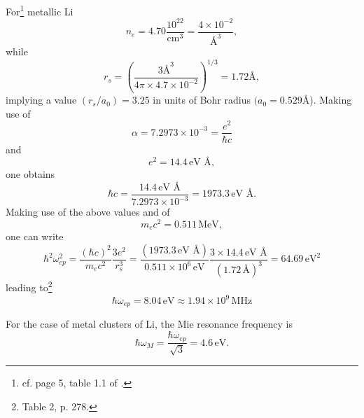 \begin{subappendices}
For\footnote{cf. page 5, table 1.1 of \cite{Ashcroft:87}.} metallic Li
\begin{equation}
n_e=4.70\frac{10^{22}}{\text{cm}^3}=\frac{4\times10^{-2}}{\text{\AA{}}^3},
\end{equation}
while
\begin{equation}
r_s=\left(\frac{3\text{\AA}^3}{4\pi\times4.7\times10^{-2}}\right)^{1/3}=1.72\text{\AA},
\end{equation}
implying a value $(r_s/a_0)=3.25$ in units of  Bohr radius $(a_0=0.529$\AA).
Making use of 
\begin{equation}
\alpha=7.2973\times10^{-3}=\frac{e^2}{\hbar c}
\end{equation}
and
\begin{equation}
e^2=14.4\,\text{eV \AA},
\end{equation}
one obtains
\begin{equation}
\hbar c=\frac{14.4\,\text{eV \AA}}{7.2973\times10^{-3}}=1973.3\,\text{eV \AA}.
\end{equation}
Making use of the above values and of
\begin{equation}
m_ec^2=0.511\,\text{MeV},
\end{equation}
one can write
\begin{equation}
\hbar^2\omega^2_{ep}=\frac{(\hbar c)^2}{m_e c^2}\frac{3e^2}{r_s^3}=\frac{(1973.3\,\text{eV \AA})}{0.511\times10^6\,\text{eV}}\frac{3\times14.4\,\text{eV \AA}}{(1.72\,\text{\AA})^3}=64.69\,\text{eV}^2
\end{equation}
leading to\footnote{\cite{Kittel:96} Table 2, p. 278.}
\begin{equation}
\hbar\omega_{ep}=8.04\,\text{eV}\approx 1.94\times 10^9\,\text{MHz}
\end{equation}


For the case of metal clusters of Li, the Mie resonance frequency is
\begin{equation}
\hbar\omega_M=\frac{\hbar\omega_{ep}}{\sqrt{3}}=4.6\,\text{eV}.
\end{equation}

\end{subappendices}
